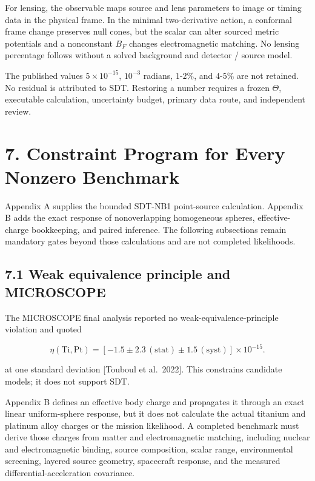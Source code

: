 \documentclass[
  american,
  11pt,
  letterpaper,
]{article}
\begin{document}
For lensing, the observable maps source and lens parameters to image or timing data in the physical frame. In the minimal two-derivative action, a conformal frame change preserves null cones, but the scalar can alter sourced metric potentials and a nonconstant \(B_F\) changes electromagnetic matching. No lensing percentage follows without a solved background and detector / source model.

The published values \(5\times10^{-15}\), \(10^{-3}\) radians, \(1\text{-}2\%\), and \(4\text{-}5\%\) are not retained. No residual is attributed to SDT. Restoring a number requires a frozen \(\Theta\), executable calculation, uncertainty budget, primary data route, and independent review.

\section{7. Constraint Program for Every Nonzero Benchmark}\label{constraint-program-for-every-nonzero-benchmark}

Appendix A supplies the bounded SDT-NB1 point-source calculation. Appendix B adds the exact response of nonoverlapping homogeneous spheres, effective-charge bookkeeping, and paired inference. The following subsections remain mandatory gates beyond those calculations and are not completed likelihoods.

\subsection{7.1 Weak equivalence principle and MICROSCOPE}\label{weak-equivalence-principle-and-microscope}

The MICROSCOPE final analysis reported no weak-equivalence-principle violation and quoted

\begin{equation}
\eta(\mathrm{Ti},\mathrm{Pt})=
\left[-1.5\pm2.3\,(\mathrm{stat})\pm1.5\,(\mathrm{syst})\right]\times10^{-15}.
\tag{24}
\end{equation}

at one standard deviation {[}Touboul et al.~2022{]}. This constrains candidate models; it does not support SDT.

Appendix B defines an effective body charge and propagates it through an exact linear uniform-sphere response, but it does not calculate the actual titanium and platinum alloy charges or the mission likelihood. A completed benchmark must derive those charges from matter and electromagnetic matching, including nuclear and electromagnetic binding, source composition, scalar range, environmental screening, layered source geometry, spacecraft response, and the measured differential-acceleration covariance.
\end{document}
